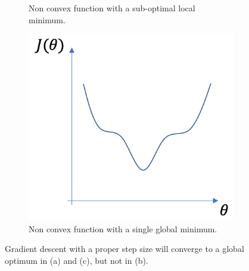 \begin{figure}[h]
\begin{subfigure}[b]{0.3\textwidth}
        \caption{Non convex function with a sub-optimal local minimum.}
        \label{fig:non_convex}
    \end{subfigure}
    \hfill %
    \begin{subfigure}[b]{0.3\textwidth}
        \includegraphics[width=\textwidth]{figures/converging_function.png}
        \caption{Non convex function with a single global minimum.}
        \label{fig:converging_non_convex}
    \end{subfigure}
    \caption{Gradient descent with a proper step size will converge to a global optimum in (a) and (c), but not in (b).}\label{fig:gradient_descent}
\end{figure}

